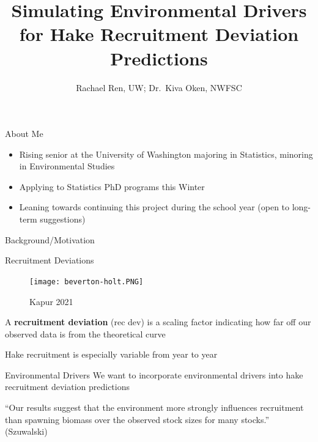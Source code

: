 \documentclass[
  ignorenonframetext,
]{beamer}
\title{Simulating Environmental Drivers for Hake Recruitment Deviation
Predictions}
\author{Rachael Ren, UW; Dr.~Kiva Oken, NWFSC}
\date{}
\providecommand{\tightlist}{%
  \setlength{\itemsep}{0pt}\setlength{\parskip}{0pt}}\usepackage{longtable,booktabs,array}
\begin{document}
\frame{\titlepage}
\ifdefined\Shaded\renewenvironment{Shaded}{\begin{tcolorbox}[sharp corners, boxrule=0pt, enhanced, breakable, borderline west={3pt}{0pt}{shadecolor}, frame hidden, interior hidden]}{\end{tcolorbox}}\fi

\begin{frame}
\begin{block}{About Me}
\protect\hypertarget{about-me}{}
\begin{itemize}
\tightlist
\item
  Rising senior at the University of Washington majoring in Statistics,
  minoring in Environmental Studies
\end{itemize}

\pause

\begin{itemize}
\tightlist
\item
  Applying to Statistics PhD programs this Winter
\end{itemize}

\pause

\begin{itemize}
\tightlist
\item
  Leaning towards continuing this project during the school year (open
  to long-term suggestions)
\end{itemize}
\end{block}
\end{frame}

\begin{frame}{Background/Motivation}
\protect\hypertarget{backgroundmotivation}{}
\begin{block}{Recruitment Deviations}
\protect\hypertarget{recruitment-deviations}{}
\begin{figure}

{\centering \texttt{[image: beverton-holt.PNG]}

}

\caption{Kapur 2021}

\end{figure}

A \textbf{recruitment deviation} (rec dev) is a scaling factor
indicating how far off our observed data is from the theoretical curve

Hake recruitment is especially variable from year to year
\end{block}

\begin{block}{Environmental Drivers}
\protect\hypertarget{environmental-drivers}{}
We want to incorporate environmental drivers into hake recruitment
deviation predictions

``Our results suggest that the environment more strongly influences
recruitment than spawning biomass over the observed stock sizes for many
stocks.'' (Szuwalski)
\end{block}
\end{frame}
\end{document}
